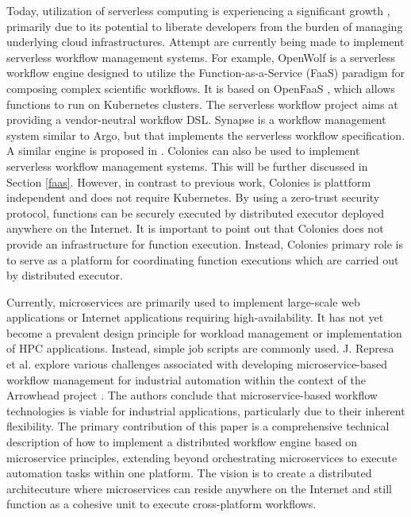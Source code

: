 \documentclass{article}
\begin{document}
Today, utilization of serverless computing is experiencing a significant growth \cite{cognit}, primarily due to its potential to liberate developers from the burden of managing underlying cloud infrastructures. Attempt are currently being made to implement serverless workflow management systems. For example, OpenWolf \cite{openwolf} is a serverless workflow engine designed to utilize the Function-as-a-Service (FaaS) paradigm for composing complex scientific workflows. It is based on OpenFaaS \cite{openfaas}, which allows functions to run on Kubernetes clusters. 
The serverless workflow project \cite{serverlessworkflows} aims at providing a vendor-neutral workflow DSL. Synapse \cite{synapse} is a workflow management system similar to Argo, but that implements the serverless workflow specification. A similar engine is proposed in \cite{scafe}. 
Colonies can also be used to implement serverless workflow management systems. This will be further discussed in Section \ref{faas}. However, in contrast to previous work, Colonies is plattform independent and does not require Kubernetes. By using a zero-trust security protocol, functions can be securely executed by distributed executor deployed anywhere on the Internet. It is important to point out that Colonies does not provide an infrastructure for function execution. Instead, Colonies primary role is to serve as a platform for coordinating function executions which are carried out by distributed executor.

Currently, microservices are primarily used to implement large-scale web applications or Internet applications requiring high-availability. It has not yet become a prevalent design principle for workload management or implementation of HPC applications. Instead, simple job scripts are commonly used. J. Represa et al. \cite{GarciaRepresa1740746, GarciaRepresa1640771} explore various challenges associated with developing microservice-based workflow management for industrial automation within the context of the Arrowhead project \cite{delsing2017iot}. The authors conclude that microservice-based workflow technologies is viable for industrial applications, particularly due to their inherent flexibility. The primary contribution of this paper is a comprehensive technical description of how to implement a distributed workflow engine based on microservice principles, extending beyond orchestrating microservices to execute automation tasks within one platform. The vision is to create a distributed architecuture where microservices can reside anywhere on the Internet and still function as a cohesive unit to execute cross-platform workflows.  
\end{document}
